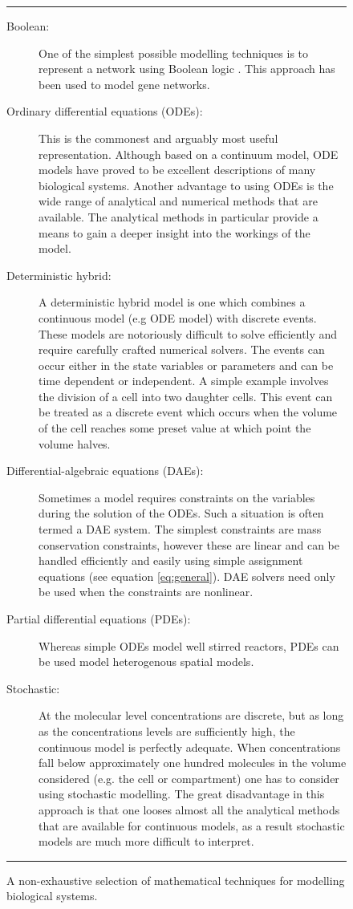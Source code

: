 \documentclass[12pt]{article}
\begin{document}
\begin{figure} \label{table:mathTechniques}
\rule[-5pt]{14cm}{1pt}
\begin{description} 
\item[Boolean:] One of the simplest possible modelling techniques
is to represent a network using Boolean logic \cite{DeJong2002}.
This approach has been used to model gene networks.
%
\item[Ordinary differential equations (ODEs):] This is the
commonest and arguably most useful representation. Although based on
a continuum model, ODE models have proved to be excellent descriptions
of many biological systems. Another advantage to
using ODEs is the wide range of analytical and numerical methods that are available. The
analytical methods in particular provide a means to gain a deeper
insight into the workings of the model.
%
\item[Deterministic hybrid:] A deterministic hybrid model is one
which combines a continuous model (e.g ODE model) with discrete
events. These models are notoriously difficult to solve efficiently and
require carefully crafted numerical solvers. The events can occur
either in the state variables or parameters and can be
time dependent or independent. A simple example involves the
division of a cell into two daughter cells. This event can be
treated as a discrete event which occurs when the volume of the
cell reaches some preset value at which point the volume halves.
%
\item[Differential-algebraic equations (DAEs):] Sometimes a model
requires constraints on the variables during the solution of the
ODEs. Such a situation is often termed a DAE system. The simplest
constraints are mass conservation constraints, however these are
linear and can be handled efficiently and easily using simple
assignment equations (see equation \ref{eq:general}). DAE solvers need only
 be used when the constraints are nonlinear.
%
\item[Partial differential equations (PDEs):] Whereas simple ODEs
model well stirred reactors, PDEs can be used model heterogenous
spatial models. 
%
\item[Stochastic:] At the molecular level concentrations are
discrete, but as long as the concentrations levels are sufficiently high,
the continuous model is perfectly adequate. When concentrations
fall below approximately one hundred molecules in the volume considered (e.g. the cell or compartment) one has to consider using stochastic modelling. The great disadvantage in
this approach is that one looses almost all the analytical methods
that are available for continuous models, as a result stochastic
models are much more difficult to interpret. 
\end{description}
\rule[6pt]{14cm}{1pt}
\caption{ A non-exhaustive selection of mathematical techniques for modelling biological systems.}
\end{figure}
\end{document}
